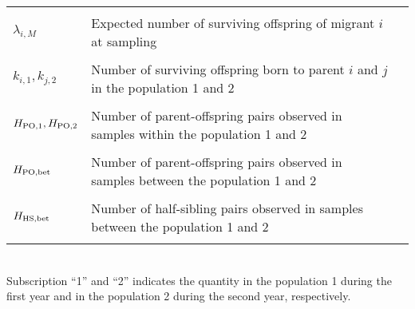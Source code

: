 \documentclass[12pt, English]{article}
\begin{document}
\begin{spacing}{1.9}
\begin{table}[tb]
\begin{tabular}{llc}
		                						& \\
	$\lambda_{i, M}$					& Expected number of surviving offspring of migrant $i$ at sampling\\
		                						& \\
	$k_{i,1}, k_{j,2}$					& Number of surviving offspring born to parent $i$ and $j$ in the population 1 and 2\\ 
	                							& \\
	$H_{\rm PO, 1}, H_{\rm PO, 2}$		& Number of parent-offspring pairs observed in samples within the population 1 and 2\\ 
	                							& \\
	$H_{\rm PO, bet}$					& Number of parent-offspring pairs observed in samples between the population 1 and 2\\ 
	                							& \\
	$H_{\rm HS, bet}$					& Number of half-sibling pairs observed in samples between the population 1 and 2\\ 
	                							& \\              		
	\hline
    \end{tabular}
    \label{symbols} 
\\Subscription ``1'' and ``2'' indicates the quantity in the population 1 during the first year and in the population 2 during the second year, respectively. 
\end{table}
\renewcommand{\arraystretch}{1}

\clearpage


\end{spacing}
\end{document}
